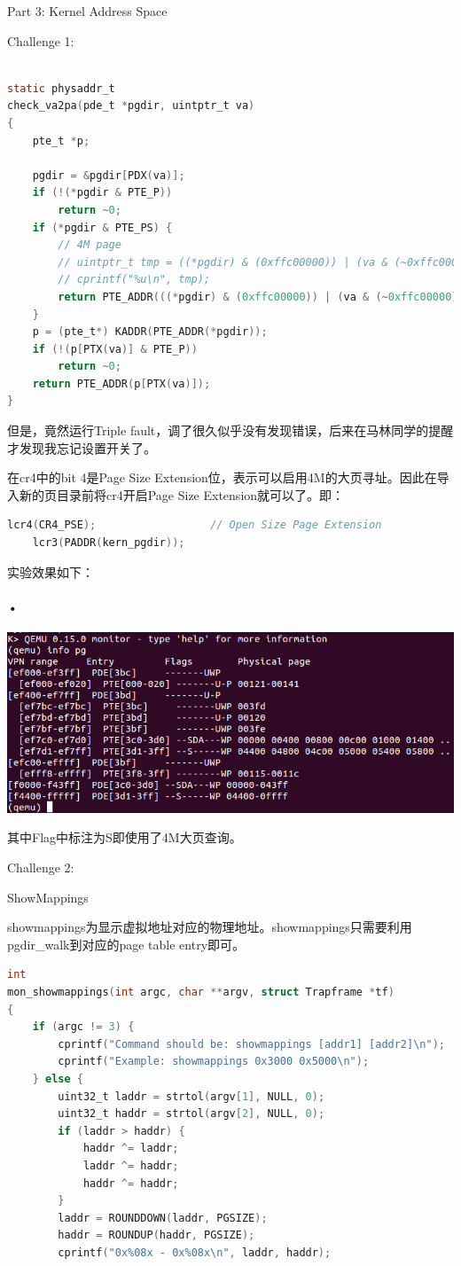 \documentclass[GBK,winfonts,a4paper,10pt]{ctexart}
\begin{document}
\begin{section}{Part 3: Kernel Address Space}
\begin{subsection}{Challenge 1:}
\begin{lstlisting}[language=C]
                    
static physaddr_t
check_va2pa(pde_t *pgdir, uintptr_t va)
{
	pte_t *p;

	pgdir = &pgdir[PDX(va)];
	if (!(*pgdir & PTE_P))
		return ~0;
	if (*pgdir & PTE_PS) {
		// 4M page
		// uintptr_t tmp = ((*pgdir) & (0xffc00000)) | (va & (~0xffc00000));
		// cprintf("%u\n", tmp);
		return PTE_ADDR(((*pgdir) & (0xffc00000)) | (va & (~0xffc00000)));
	}
	p = (pte_t*) KADDR(PTE_ADDR(*pgdir));
	if (!(p[PTX(va)] & PTE_P))
		return ~0;
	return PTE_ADDR(p[PTX(va)]);
}
\end{lstlisting}
\par
但是，竟然运行Triple fault，调了很久似乎没有发现错误，后来在马林同学的提醒才发现我忘记设置开关了。
\par
在cr4中的bit 4是Page Size Extension位，表示可以启用4M的大页寻址。因此在导入新的页目录前将cr4开启Page Size Extension就可以了。即：
\begin{lstlisting}[language=C]
	lcr4(CR4_PSE);					// Open Size Page Extension
	lcr3(PADDR(kern_pgdir));
\end{lstlisting}
\par
实验效果如下：
\paragraph{•}
\includegraphics[scale=0.5]{PSE.png}
\par
其中Flag中标注为S即使用了4M大页查询。
\end{subsection}

\begin{subsection}{Challenge 2:}
\begin{subsubsection}{ ShowMappings }
\par
showmappings为显示虚拟地址对应的物理地址。showmappings只需要利用pgdir\_walk到对应的page table entry即可。
\begin{lstlisting}[language=C]
int
mon_showmappings(int argc, char **argv, struct Trapframe *tf)
{
    if (argc != 3) {
        cprintf("Command should be: showmappings [addr1] [addr2]\n");
        cprintf("Example: showmappings 0x3000 0x5000\n");
    } else {
        uint32_t laddr = strtol(argv[1], NULL, 0);
        uint32_t haddr = strtol(argv[2], NULL, 0);
        if (laddr > haddr) {
            haddr ^= laddr;
            laddr ^= haddr;
            haddr ^= haddr;
        }
        laddr = ROUNDDOWN(laddr, PGSIZE);
        haddr = ROUNDUP(haddr, PGSIZE);
        cprintf("0x%08x - 0x%08x\n", laddr, haddr);
        

\end{lstlisting}
\end{subsubsection}
\end{subsection}
\end{section}
\end{document}
